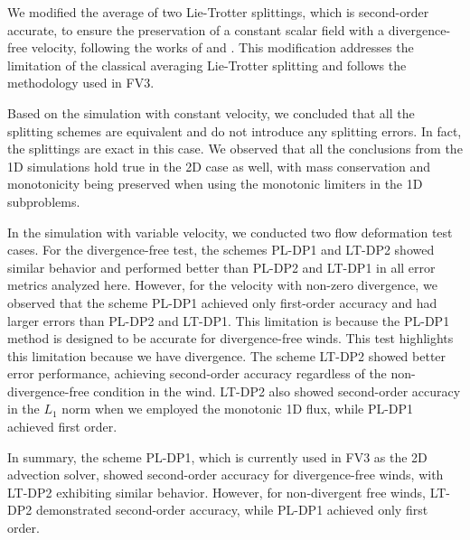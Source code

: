 We modified the average of two Lie-Trotter splittings, which is second-order accurate, 
to ensure the preservation of a constant scalar field with a divergence-free velocity,
following the works of \citet{lin:1996} and \citet{putman:2007}.
This modification addresses the limitation of the classical averaging Lie-Trotter splitting and follows the methodology used in FV3.

Based on the simulation with constant velocity, we concluded that all the splitting schemes
are equivalent and do not introduce any splitting errors. In fact, the splittings are exact in this case.
We observed that all the conclusions from the 1D simulations hold true in the 2D case as well,
with mass conservation and monotonicity being preserved when using the monotonic limiters in the 1D subproblems.

In the simulation with variable velocity, we conducted two flow deformation test cases.
For the divergence-free test, the schemes PL-DP1 and LT-DP2 showed similar behavior and performed better
than PL-DP2 and LT-DP1 in all error metrics analyzed here.
However, for the velocity with non-zero divergence, we observed that the scheme PL-DP1 achieved only
first-order accuracy and had larger errors than PL-DP2 and LT-DP1.
This limitation is because the PL-DP1 method is designed to be accurate for divergence-free winds.
This test highlights this limitation because we have divergence.
The scheme LT-DP2 showed better error performance, achieving second-order accuracy regardless of the non-divergence-free condition in the wind.
LT-DP2 also showed second-order accuracy in the $L_1$ norm when we employed the monotonic 1D flux, while PL-DP1 achieved first order.

In summary, the scheme PL-DP1, which is currently used in FV3 as the 2D advection solver, 
showed second-order accuracy for divergence-free winds, with LT-DP2 exhibiting similar behavior. 
However, for non-divergent free winds, LT-DP2 demonstrated second-order accuracy, while PL-DP1 achieved only first order.

